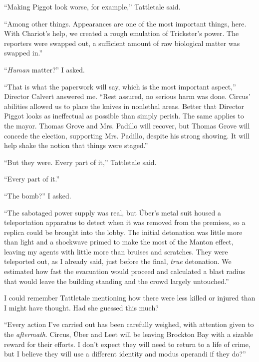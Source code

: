 ``Making Piggot look worse, for example,'' Tattletale said.



``Among other things.  Appearances are one of the most important things, here.  With Chariot's help, we created a rough emulation of Trickster's power.  The reporters were swapped out, a sufficient amount of raw biological matter was swapped in.''



``\emph{Human} matter?'' I asked.



``That is what the paperwork will say, which is the most important aspect,'' Director Calvert answered me.  ``Rest assured, no serious harm was done.  Circus' abilities allowed us to place the knives in nonlethal areas.  Better that Director Piggot looks as ineffectual as possible than simply perish.  The same applies to the mayor.  Thomas Grove and Mrs. Padillo will recover, but Thomas Grove will concede the election, supporting Mrs. Padillo, despite his strong showing.  It will help shake the notion that things were staged.''



``But they were.  Every part of it,'' Tattletale said.



``Every part of it.''



``The bomb?'' I asked.



``The sabotaged power supply was real, but \"{U}ber's metal suit housed a teleportation apparatus to detect when it was removed from the premises, so a replica could be brought into the lobby.  The initial detonation was little more than light and a shockwave primed to make the most of the Manton effect, leaving my agents with little more than bruises and scratches.  They were teleported out, as I already said, just before the final, \emph{true} detonation.  We estimated how fast the evacuation would proceed and calculated a blast radius that would leave the building standing and the crowd largely untouched.''



I could remember Tattletale mentioning how there were less killed or injured than I might have thought.  Had she guessed this much?



``Every action I've carried out has been carefully weighed, with attention given to the \emph{aftermath}.  Circus, \"{U}ber and Leet will be leaving Brockton Bay with a sizable reward for their efforts.  I don't expect they will need to return to a life of crime, but I believe they will use a different identity and modus operandi if they do?''



